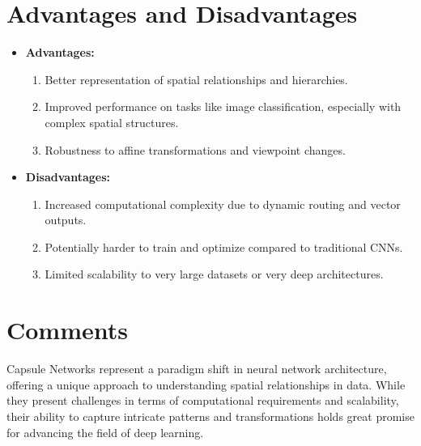 \section{Advantages and Disadvantages}
\begin{itemize}
    \item \textbf{Advantages:}
    \begin{enumerate}
        \item Better representation of spatial relationships and hierarchies.
        \item Improved performance on tasks like image classification, especially with complex spatial structures.
        \item Robustness to affine transformations and viewpoint changes.
    \end{enumerate}
    \item \textbf{Disadvantages:}
    \begin{enumerate}
        \item Increased computational complexity due to dynamic routing and vector outputs.
        \item Potentially harder to train and optimize compared to traditional CNNs.
        \item Limited scalability to very large datasets or very deep architectures.
    \end{enumerate}
\end{itemize}

\section{Comments}
Capsule Networks represent a paradigm shift in neural network architecture, offering a unique approach to understanding spatial relationships in data. While they present challenges in terms of computational requirements and scalability, their ability to capture intricate patterns and transformations holds great promise for advancing the field of deep learning.
